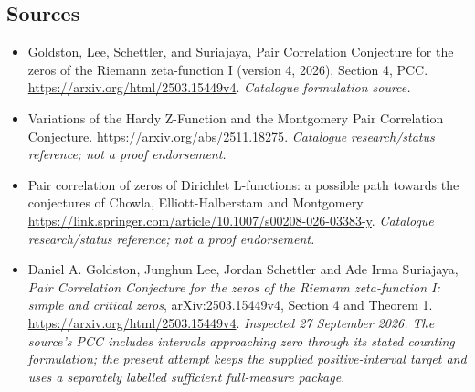 \documentclass[11pt,a4paper]{article}
\numberwithin{equation}{section}
\begin{document}
\subsection{Sources}
\begin{itemize}\raggedright
\item[\textnormal{[S1]}]\hypertarget{source:74:1}{} Goldston, Lee, Schettler, and Suriajaya, Pair Correlation Conjecture for the zeros of the Riemann zeta-function I (version 4, 2026), Section 4, PCC.
\url{https://arxiv.org/html/2503.15449v4}.
{\small\textit{Catalogue formulation source.}}
\item[\textnormal{[S2]}]\hypertarget{source:74:2}{} Variations of the Hardy Z-Function and the Montgomery Pair Correlation Conjecture.
\url{https://arxiv.org/abs/2511.18275}.
{\small\textit{Catalogue research/status reference; not a proof endorsement.}}
\item[\textnormal{[S3]}]\hypertarget{source:74:3}{} Pair correlation of zeros of Dirichlet L-functions: a possible path towards the conjectures of Chowla, Elliott-Halberstam and Montgomery.
\url{https://link.springer.com/article/10.1007/s00208-026-03383-y}.
{\small\textit{Catalogue research/status reference; not a proof endorsement.}}
\item[\textnormal{[E1]}]\hypertarget{extra:74:1}{} Daniel A. Goldston,
Junghun Lee, Jordan Schettler and Ade Irma Suriajaya,
\emph{Pair Correlation Conjecture for the zeros of the Riemann zeta-function I:
simple and critical zeros}, arXiv:2503.15449v4, Section 4 and Theorem 1.
\url{https://arxiv.org/html/2503.15449v4}.
{\small\textit{Inspected 27 September 2026. The source's PCC includes
intervals approaching zero through its stated counting formulation;
the present attempt keeps the supplied positive-interval target and uses
a separately labelled sufficient full-measure package.}}
\end{itemize}
\end{document}
